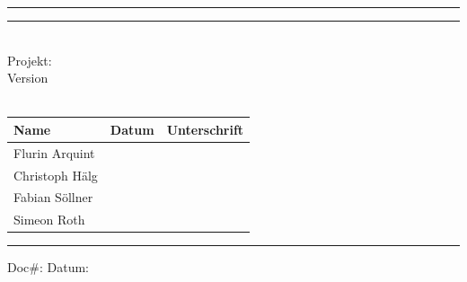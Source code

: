 
\hrule
{}
\hrule
\begin{center}
   	\begin{flushright}
   		\Huge
   		\titleinfo\\
   		\Large
   		Projekt: \subjectinfo\\
   		\large
   		Version \versioninfo\\
   		\authorinfo \\			
   	\end{flushright}
   	\renewcommand\arraystretch{1.5}
   	\begin{tabularx}{\linewidth}{|Z|Y|Z|}
   		\hline
   		\textbf{Name} & \textbf{Datum} & \textbf{Unterschrift}\\
   		\hline
   		Flurin Arquint & \printdate{\dateinfo} & \\
   		\hline
   		Christoph Hälg & \printdate{\dateinfo} & \\
   		\hline
   		Fabian Söllner & \printdate{\dateinfo} & \\
   		\hline
   		Simeon Roth & \printdate{\dateinfo} & \\
        \hline
   	\end{tabularx}
\end{center}
\cfoot{}
\hrule
{
    \footnotesize 
    \begin{flushright}
        Doc\#: \docNr\linebreak
        Datum: \dateinfo
    \end{flushright}
}

\restoregeometry